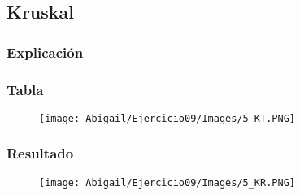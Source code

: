 \documentclass[12pt]{article}
\begin{document}
    \subsection{Kruskal}

      \subsubsection{Explicación}

      \subsubsection{Tabla}
        \begin{figure}[h!]
          \centering
          \texttt{[image: Abigail/Ejercicio09/Images/5\_KT.PNG]}
        \end{figure} 

      \subsubsection{Resultado}

        \begin{figure}[h!]
          \centering
          \texttt{[image: Abigail/Ejercicio09/Images/5\_KR.PNG]}
        \end{figure} 
\end{document}
